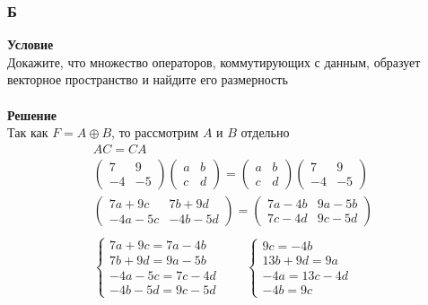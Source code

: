 		\subsubsection*{\textbf{Б}}
		\textbf{Условие}\\
		Докажите, что множество операторов, коммутирующих с данным, образует векторное пространство и найдите его размерность\\
		\\
		\textbf{Решение}\\
		Так как $F = A \oplus B$, то рассмотрим $A$ и $B$ отдельно
		\begin{gather*}
			AC = CA\\
			\begin{pmatrix}
				7 & 9\\
				-4 & -5
			\end{pmatrix}
			\begin{pmatrix}
				a & b\\
				c & d
			\end{pmatrix}
			=
			\begin{pmatrix}
				a & b\\
				c & d
			\end{pmatrix}
			\begin{pmatrix}
				7 & 9\\
				-4 & -5
			\end{pmatrix}\\
			\begin{pmatrix}
				7a + 9c & 7b + 9d\\
				-4a - 5c & -4b -5d
			\end{pmatrix}
			=
			\begin{pmatrix}
			7a - 4b & 9a - 5b\\
			7c - 4d & 9c - 5d
			\end{pmatrix}\\
			\\
			\begin{cases}
				7a + 9c = 7a - 4b\\
				7b + 9d = 9a - 5b\\
				-4a - 5c = 7c - 4d\\
				-4b - 5d = 9c - 5d
			\end{cases}
			\qquad
			\begin{cases}
				9c = - 4b\\
				13b + 9d = 9a\\
				-4a = 13c - 4d\\
				-4b = 9c
			\end{cases}
			\\	

\end{gather*}
